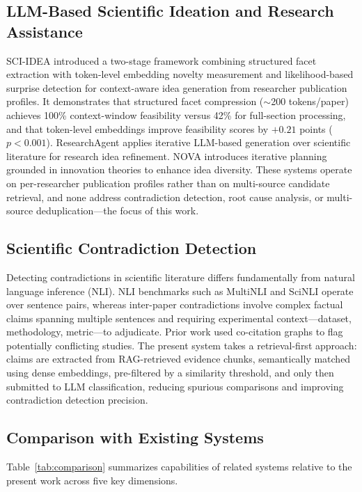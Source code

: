 \documentclass[conference]{IEEEtran}
\begin{document}
\subsection{LLM-Based Scientific Ideation and Research Assistance}

SCI-IDEA \cite{b16} introduced a two-stage framework combining structured
facet extraction with token-level embedding novelty measurement and
likelihood-based surprise detection for context-aware idea generation from
researcher publication profiles. It demonstrates that structured facet
compression ($\sim$200 tokens/paper) achieves 100\% context-window
feasibility versus 42\% for full-section processing, and that token-level
embeddings improve feasibility scores by $+0.21$ points ($p < 0.001$).
ResearchAgent \cite{b18} applies iterative LLM-based generation over
scientific literature for research idea refinement. NOVA \cite{b17} introduces
iterative planning grounded in innovation theories to enhance idea diversity.
These systems operate on per-researcher publication profiles rather than on
multi-source candidate retrieval, and none address contradiction detection,
root cause analysis, or multi-source deduplication---the focus of this work.

\subsection{Scientific Contradiction Detection}

Detecting contradictions in scientific literature differs fundamentally
from natural language inference (NLI). NLI benchmarks such as
MultiNLI \cite{b12} and SciNLI \cite{b13} operate over sentence pairs, whereas
inter-paper contradictions involve complex factual claims spanning multiple
sentences and requiring experimental context---dataset, methodology,
metric---to adjudicate. Prior work \cite{b14} used co-citation graphs to flag
potentially conflicting studies. The present system takes a retrieval-first
approach: claims are extracted from RAG-retrieved evidence chunks,
semantically matched using dense embeddings, pre-filtered by a similarity
threshold, and only then submitted to LLM classification, reducing spurious
comparisons and improving contradiction detection precision.

\subsection{Comparison with Existing Systems}

Table~\ref{tab:comparison} summarizes capabilities of related systems
relative to the present work across five key dimensions.
\end{document}

